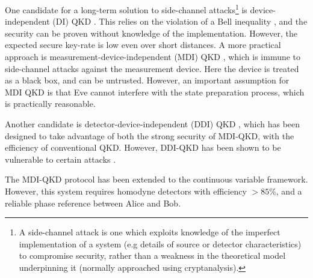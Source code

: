 One candidate for a long-term solution to side-channel attacks\footnote{A side-channel attack is one which exploits knowledge of the imperfect implementation of a system (e.g details of source or detector characteristics) to compromise security, rather than a weakness in the theoretical model underpinning it (normally approached using cryptanalysis).} is device-independent (DI) QKD \cite{bib:PhysRevLett.98.230501}. This relies on the violation of a Bell inequality \cite{bib:hensen2015loophole}, and the security can be proven without knowledge of the implementation. However, the expected secure key-rate is low even over short distances. A more practical approach is measurement-device-independent (MDI) QKD \cite{bib:PhysRevLett.108.130503}, which is immune to side-channel attacks against the measurement device. Here the device is treated as a black box, and can be untrusted. However, an important assumption for MDI QKD is that Eve cannot interfere with the state preparation process, which is practically reasonable. 

Another candidate is detector-device-independent (DDI) QKD \cite{bib:lim2014detector, bib:PhysRevA.92.022337}, which has been designed to take advantage of both the strong security of MDI-QKD, with the efficiency of conventional QKD. However, DDI-QKD has been shown to be vulnerable to certain attacks \cite{bib:PhysRevLett.117.250505}. 

The MDI-QKD protocol has been extended to the continuous variable framework. However, this system requires homodyne detectors with efficiency $>85\%$, and a reliable phase reference between Alice and Bob.  







